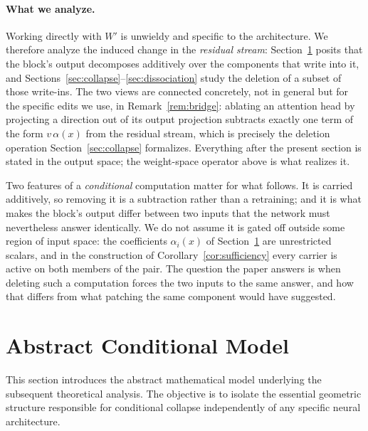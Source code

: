 \documentclass[11pt,a4paper]{article}
\begin{document}
\paragraph{What we analyze.} Working directly with $W'$
is unwieldy and specific to the architecture. We therefore analyze the induced
change in the \emph{residual stream}: Section~\ref{sec:model} posits that the
block's output decomposes additively over the components that write into it,
and Sections~\ref{sec:collapse}--\ref{sec:dissociation} study the deletion of
a subset of those write-ins. The two views are connected concretely, not
in general but for the specific edits we use, in
Remark~\ref{rem:bridge}: ablating an attention head by projecting a direction
out of its output projection subtracts exactly one term of the form
$v\,\alpha(x)$ from the residual stream, which is precisely the deletion
operation Section~\ref{sec:collapse} formalizes. Everything after the present
section is stated in the output space; the weight-space operator above is
what realizes it.

Two features of a \emph{conditional} computation matter for what follows.
It is carried additively, so removing it is a subtraction rather than a
retraining; and it is what makes the block's output differ between two inputs
that the network must nevertheless answer identically. We do not assume it is
gated off outside some region of input space: the coefficients
$\alpha_i(x)$ of Section~\ref{sec:model} are unrestricted scalars, and in the
construction of Corollary~\ref{cor:sufficiency} every carrier is active on
both members of the pair. The question the paper answers is when deleting
such a computation forces the two inputs to the same answer, and how that
differs from what patching the same component would have suggested.

\section{Abstract Conditional Model}
\label{sec:model}

This section introduces the abstract mathematical model underlying the
subsequent theoretical analysis. The objective is to isolate the essential
geometric structure responsible for conditional collapse independently of any
specific neural architecture.

\end{document}
